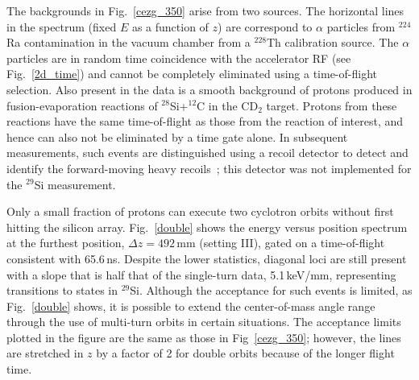 The backgrounds in Fig.~\ref{cezg_350} arise from two sources.  
The horizontal lines in the spectrum (fixed $E$ as a function of $z$) are correspond
to $\alpha$ particles from $^{224}$Ra contamination in the vacuum chamber from a $^{228}$Th calibration source.  The $\alpha$ particles are in random time coincidence with the accelerator RF (see Fig.~\ref{2d_time}) and cannot be
completely eliminated using a time-of-flight selection.  
Also present in the data is a smooth background of protons produced in fusion-evaporation reactions  of $^{28}$Si+$^{12}$C in the CD$_2$ target.  Protons from these reactions have the same time-of-flight as those from the reaction of
interest, and hence can also not be eliminated by a time gate alone.  In subsequent measurements, such events are distinguished using a recoil detector to detect and identify the forward-moving heavy recoils~\cite{Schiffer_2010,Wuosmaa_2010}; this detector was not implemented for the $^{29}$Si measurement.    

Only a small fraction of protons can execute two cyclotron orbits without first hitting the silicon array.  Fig.~\ref{double} shows the energy versus position spectrum at the furthest position, $\Delta z=492$\,mm (setting III), gated on a time-of-flight consistent with 65.6\,ns.  Despite
the lower statistics, diagonal loci are still present with a slope
that is half that of the single-turn data, 5.1\,keV/mm, representing transitions to
states in $^{29}$Si.  Although the acceptance for such events is
limited, as Fig.~\ref{double} shows, it is possible to extend the center-of-mass angle range
through the use of multi-turn orbits in certain situations.
The acceptance limits plotted in the figure are the same as those in Fig~\ref{cezg_350}; however, the lines are stretched in $z$ by a factor of 2 %
for double orbits because of the longer flight time.

